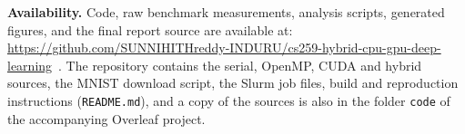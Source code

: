 \textbf{Availability.} Code, raw benchmark measurements, analysis scripts, generated figures, and the final report source are available at: \url{https://github.com/SUNNIHITHreddy-INDURU/cs259-hybrid-cpu-gpu-deep-learning}~\cite{induru2026repository}. The repository contains the serial, OpenMP, CUDA and hybrid sources, the MNIST download script, the Slurm job files, build and reproduction instructions (\texttt{README.md}), and a copy of the sources is also in the folder \texttt{code} of the accompanying Overleaf project.
